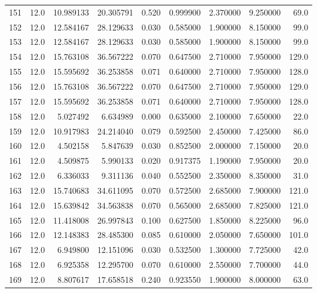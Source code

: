 \begin{tabular}{lrrrrrrrr}
151  &   12.0 &  10.989133 &  20.305791 &  0.520 &  0.999900 &  2.370000 &   9.250000 &   69.0 \\
152  &   12.0 &  12.584167 &  28.129633 &  0.030 &  0.585000 &  1.900000 &   8.150000 &   99.0 \\
153  &   12.0 &  12.584167 &  28.129633 &  0.030 &  0.585000 &  1.900000 &   8.150000 &   99.0 \\
154  &   12.0 &  15.763108 &  36.567222 &  0.070 &  0.647500 &  2.710000 &   7.950000 &  129.0 \\
155  &   12.0 &  15.595692 &  36.253858 &  0.071 &  0.640000 &  2.710000 &   7.950000 &  128.0 \\
156  &   12.0 &  15.763108 &  36.567222 &  0.070 &  0.647500 &  2.710000 &   7.950000 &  129.0 \\
157  &   12.0 &  15.595692 &  36.253858 &  0.071 &  0.640000 &  2.710000 &   7.950000 &  128.0 \\
158  &   12.0 &   5.027492 &   6.634989 &  0.000 &  0.635000 &  2.100000 &   7.650000 &   22.0 \\
159  &   12.0 &  10.917983 &  24.214040 &  0.079 &  0.592500 &  2.450000 &   7.425000 &   86.0 \\
160  &   12.0 &   4.502158 &   5.847639 &  0.030 &  0.852500 &  2.000000 &   7.150000 &   20.0 \\
161  &   12.0 &   4.509875 &   5.990133 &  0.020 &  0.917375 &  1.190000 &   7.950000 &   20.0 \\
162  &   12.0 &   6.336033 &   9.311136 &  0.040 &  0.552500 &  2.350000 &   8.350000 &   31.0 \\
163  &   12.0 &  15.740683 &  34.611095 &  0.070 &  0.572500 &  2.685000 &   7.900000 &  121.0 \\
164  &   12.0 &  15.639842 &  34.563838 &  0.070 &  0.565000 &  2.685000 &   7.825000 &  121.0 \\
165  &   12.0 &  11.418008 &  26.997843 &  0.100 &  0.627500 &  1.850000 &   8.225000 &   96.0 \\
166  &   12.0 &  12.148383 &  28.485300 &  0.085 &  0.610000 &  2.050000 &   7.650000 &  101.0 \\
167  &   12.0 &   6.949800 &  12.151096 &  0.030 &  0.532500 &  1.300000 &   7.725000 &   42.0 \\
168  &   12.0 &   6.925358 &  12.295700 &  0.070 &  0.610000 &  2.550000 &   7.700000 &   44.0 \\
169  &   12.0 &   8.807617 &  17.658518 &  0.240 &  0.923550 &  1.900000 &   8.000000 &   63.0 \\

\end{tabular}
